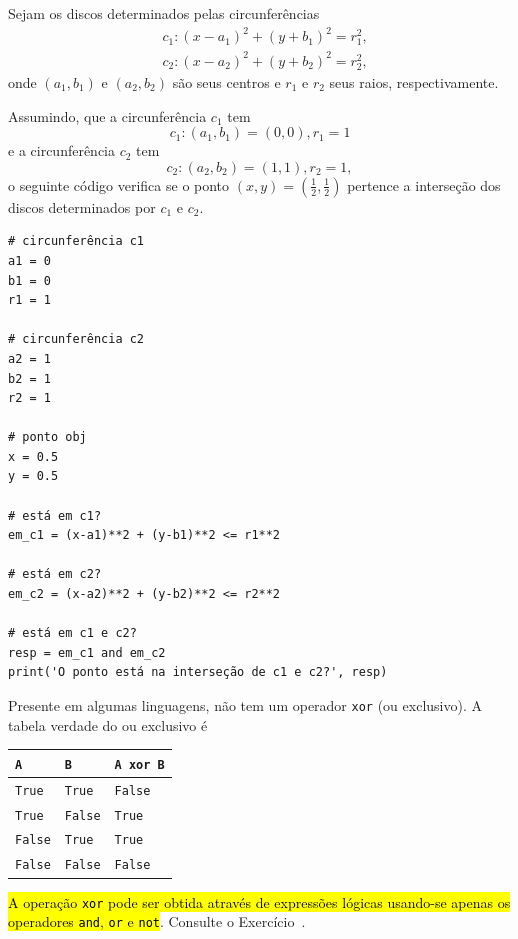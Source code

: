 \begin{ex}
  Sejam os discos determinados pelas circunferências
  \begin{align}
    & c_1: (x - a_1)^2 + (y + b_1)^2 = r_1^2, \\
    & c_2: (x - a_2)^2 + (y + b_2)^2 = r_2^2,
  \end{align}
  onde $(a_1, b_1)$ e $(a_2, b_2)$ são seus centros e $r_1$ e $r_2$ seus raios, respectivamente.

  Assumindo, que a circunferência $c_1$ tem
  \begin{equation}
    c_1: (a_1, b_1) = (0, 0), r_1 = 1
  \end{equation}
  e a circunferência $c_2$ tem
  \begin{equation}
    c_2: (a_2, b_2) = (1, 1), r_2 = 1,
  \end{equation}
  o seguinte código verifica se o ponto $(x, y) = \left(\frac{1}{2}, \frac{1}{2}\right)$ pertence a interseção dos discos determinados por $c_1$ e $c_2$.

\begin{lstlisting}
# circunferência c1
a1 = 0
b1 = 0
r1 = 1

# circunferência c2
a2 = 1
b2 = 1
r2 = 1

# ponto obj
x = 0.5
y = 0.5

# está em c1?
em_c1 = (x-a1)**2 + (y-b1)**2 <= r1**2

# está em c2?
em_c2 = (x-a2)**2 + (y-b2)**2 <= r2**2

# está em c1 e c2?
resp = em_c1 and em_c2
print('O ponto está na interseção de c1 e c2?', resp)
\end{lstlisting}
\end{ex}

\ifisbook
\vspace{0.5cm}
\fi

\begin{obs}\label{cap_lingua_sec_bool:obs:xor}
  Presente em algumas linguagens, {\python} não tem um operador \lstinline+xor+ (ou exclusivo). A tabela verdade do ou exclusivo é
  \begin{center}
    \begin{tabular}[H]{ll|l}
      {\texttt{A}}     & {\texttt{B}}     & {\lstinline+A xor B+} \\\hline
      {\texttt{True}}  & {\texttt{True}}  & {\texttt{False}}   \\
      {\texttt{True}}  & {\texttt{False}} & {\texttt{True}}    \\
      {\texttt{False}} & {\texttt{True}}  & {\texttt{True}}    \\
      {\texttt{False}} & {\texttt{False}} & {\texttt{False}}   \\\hline    
    \end{tabular}
  \end{center}
  \hl{A operação \texttt{xor} pode ser obtida através de expressões lógicas usando-se apenas os operadores \texttt{and}, \texttt{or} e \texttt{not}}. Consulte o Exercício~.
\end{obs}

